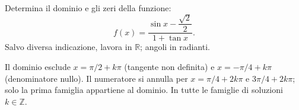 
\begin{esercizio}
Determina il dominio e gli zeri della funzione: 
\[
f(x)=\dfrac{\sin x-\dfrac{\sqrt{2}}{2}}{1+\tan x}.
\]
Salvo diversa indicazione, lavora in $\mathbb R$; angoli in radianti.
\end{esercizio}

\begin{soluzione}
Il dominio esclude $x=\pi/2+k\pi$ (tangente non definita)
e $x=-\pi/4+k\pi$ (denominatore nullo).
Il numeratore si annulla per $x=\pi/4+2k\pi$ e $3\pi/4+2k\pi$;
solo la prima famiglia appartiene al dominio. In tutte le famiglie di soluzioni $k\in\mathbb{Z}$.
\end{soluzione}
